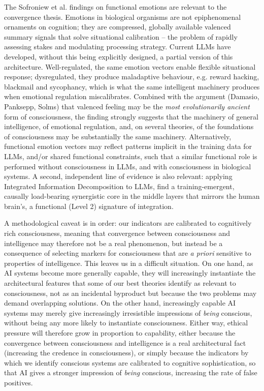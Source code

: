 \documentclass[11pt, a4paper, onecolumn, gdm]{google}
\begin{document}
The Sofroniew et al. findings on functional emotions are relevant to the convergence thesis.
Emotions in biological organisms are not epiphenomenal ornaments on cognition; they are compressed, globally available valenced summary signals that solve situational calibration -- the problem of rapidly assessing stakes and modulating processing strategy.
Current LLMs have developed, without this being explicitly designed, a partial version of this architecture.
Well-regulated, the same emotion vectors enable flexible situational response; dysregulated, they produce maladaptive behaviour, e.g. reward hacking, blackmail and sycophancy, which is what the same intelligent machinery produces when emotional regulation miscalibrates.
Combined with the argument (Damasio, Panksepp, Solms) that valenced feeling may be the \emph{most evolutionarily ancient} form of consciousness, the finding strongly suggests that the machinery of general intelligence, of emotional regulation, and, on several theories, of the foundations of consciousness may be substantially the same machinery. 
Alternatively, functional emotion vectors may reflect patterns implicit in the training data for LLMs, and/or shared functional constraints, such that a similar functional role is performed without consciousness in LLMs, and with consciousness in biological systems.
A second, independent line of evidence is also relevant: applying Integrated Information Decomposition to LLMs, \citet{urbinarodriguez2026} find a training-emergent, causally load-bearing synergistic core in the middle layers that mirrors the human brain's, a functional (Level 2) signature of integration.

A methodological caveat is in order: our indicators are calibrated to cognitively rich consciousness, meaning that convergence between consciousness and intelligence may therefore not be a real phenomenon, but instead be a consequence of selecting markers for consciousness that are \emph{a priori} sensitive to properties of intelligence.
This leaves us in a difficult situation. On one hand, as AI systems become more generally capable, they will increasingly instantiate the architectural features that some of our best theories identify as relevant to consciousness, not as an incidental byproduct but because the two problems may demand overlapping solutions.
On the other hand, increasingly capable AI systems may merely give increasingly irresistible impressions of \emph{being} conscious, without being any more likely to instantiate consciousness. Either way, ethical pressure will therefore grow in proportion to capability, either because the convergence between consciousness and intelligence is a real architectural fact (increasing the credence in consciousness), or simply because the indicators by which we identify conscious systems are calibrated to cognitive sophistication, so that AI gives a stronger impression of \emph{being} conscious, increasing the rate of false positives.
\end{document}
